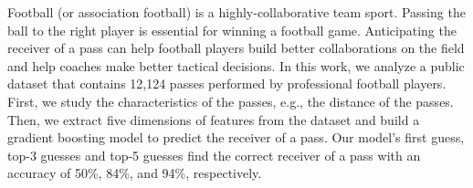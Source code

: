 Football (or association football) is a highly-collaborative team sport. 
Passing the ball to the right player is essential for winning a football game.
Anticipating the receiver of a pass can help football players build better collaborations on the field and help coaches make better tactical decisions.
In this work, we analyze a public dataset that contains 12,124 passes performed by professional football players.
First, we study the characteristics of the passes, e.g., the distance of the passes.
Then, we extract five dimensions of features from the dataset and build a gradient boosting model to predict the receiver of a pass. 
Our model's first guess, top-3 guesses and top-5 guesses find the correct receiver of a pass with an accuracy of 50\%, 84\%, and 94\%, respectively.
